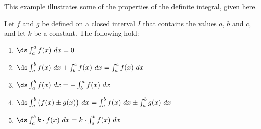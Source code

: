 This example illustrates some of the properties of the definite integral, given here.

{Let $f$ and $g$ be defined on a closed interval $I$ that contains the values $a$, $b$ and $c$, and let $k$ be a constant. The following hold:
		\begin{enumerate}
		\item		$\ds \int_a^a f(x)\ dx = 0$
		\item		$\ds \int_a^b f(x)\ dx + \int_b^c f(x)\ dx = \int_a^cf(x)\ dx$
		\item		$\ds \int_a^bf(x)\ dx = -\int_b^a f(x)\ dx$
		\item		$\ds \int_a^b\big(f(x)\pm g(x)\big)\ dx = \int_a^bf(x)\ dx \pm \int_a^bg(x)\ dx$
		\item		$\ds \int_a^bk\cdot f(x)\ dx = k\cdot\int_a^bf(x)\ dx$
		\end{enumerate}
}

